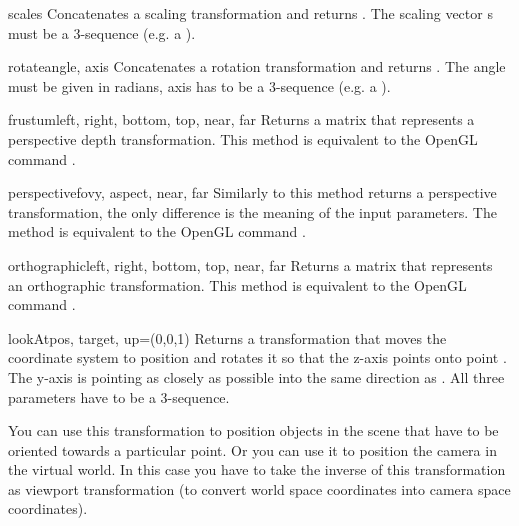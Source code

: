 \begin{methoddesc}{scale}{s}
Concatenates a scaling transformation and returns . The scaling
vector s must be a 3-sequence (e.g. a ).
\end{methoddesc}

\begin{methoddesc}{rotate}{angle, axis}
Concatenates a rotation transformation and returns . The angle
must be given in radians, axis has to be a 3-sequence (e.g. a ).
\end{methoddesc}

\begin{methoddesc}{frustum}{left, right, bottom, top, near, far}
Returns a matrix that represents a perspective depth
transformation. This method is equivalent to the OpenGL command
.

\end{methoddesc}

\begin{methoddesc}{perspective}{fovy, aspect, near, far}
Similarly to  this method returns a perspective
transformation, the only difference is the meaning of the input
parameters. The method is equivalent to the OpenGL command
.
\end{methoddesc}

\begin{methoddesc}{orthographic}{left, right, bottom, top, near, far}
Returns a matrix that represents an orthographic transformation. This
method is equivalent to the OpenGL command .
\end{methoddesc}

\begin{methoddesc}{lookAt}{pos, target, up=(0,0,1)}
Returns a transformation that moves the coordinate system to position
 and rotates it so that the z-axis points onto point
. The y-axis is pointing as closely as possible into the
same direction as . All three parameters have to be a
3-sequence.

You can use this transformation to position objects in the scene that
have to be oriented towards a particular point. Or you can use it to
position the camera in the virtual world. In this case you have to
take the inverse of this transformation as viewport transformation (to
convert world space coordinates into camera space coordinates).
\end{methoddesc}

